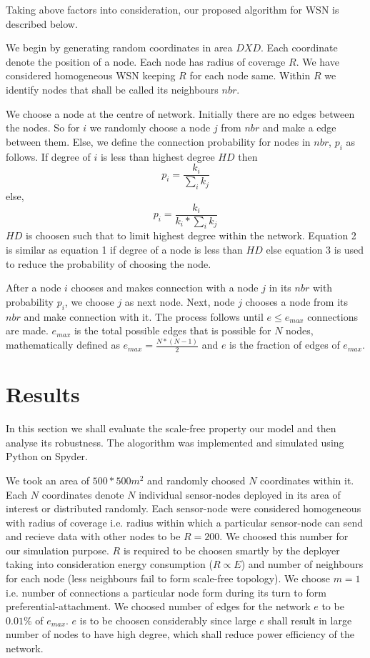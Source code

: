 \documentclass{article}
\begin{document}
Taking above factors into consideration, our proposed algorithm for WSN is described below.

We begin by generating random coordinates in area $DXD$. Each coordinate denote the position of a node. Each node has radius of coverage $R$. We have considered homogeneous WSN keeping $R$ for each node same. Within $R$ we identify nodes that shall be called its neighbours $nbr$. 

We choose a node at the centre of network. Initially there are no edges between the nodes. So for $i$ we randomly choose a node $j$ from $nbr$ and make a edge between them. Else, we define the connection probability for nodes in $nbr$, $p_i$ as follows. If degree of $i$ is less than highest degree $HD$ then \begin{equation} p_i = \frac{k_i}{\sum_i{k_j}}\end{equation} else, \begin{equation}p_i = \frac{k_i}{k_i*\sum_i{k_j}}\end{equation} $HD$ is choosen such that to limit highest degree within the network. Equation 2 is similar as equation 1 if degree of a node is less than $HD$ else equation 3 is used to reduce the probability of choosing the node.

After a node $i$ chooses and makes connection with a node $j$ in its $nbr$ with probability $p_i$, we choose $j$ as next node. Next, node $j$ chooses a node from its $nbr$ and make connection with it. The process follows until $e \leq e_{max}$ connections are made. $e_{max}$ is the total possible edges that is possible for $N$ nodes, mathematically defined as $e_{max} =  \frac{N*(N-1)}{2}$ and $e$ is the fraction of edges of $e_{max}$.


\section{Results}
In this section we shall evaluate the scale-free property our model and then analyse its robustness. The alogorithm was implemented and simulated using Python on Spyder.

We took an area of $500*500 m^2$ and randomly choosed $N$ coordinates within it. Each $N$ coordinates denote $N$ individual sensor-nodes deployed in its area of interest or distributed randomly. Each sensor-node were considered homogeneous with radius of coverage i.e. radius within which a particular sensor-node can send and recieve data with other nodes to be $R=200$. We choosed this number for our simulation purpose. $R$ is required to be choosen smartly by the deployer taking into consideration energy consumption ($R\propto E$) and number of neighbours for each node (less neighbours fail to form scale-free topology). We choose $m=1$ i.e. number of connections a particular node form during its turn to form preferential-attachment. We choosed number of edges for the network $e$ to be $0.01\%$ of $e_{max}$. $e$ is to be choosen considerably since large $e$ shall result in large number of nodes to have high degree, which shall reduce power efficiency of the network.
\end{document}
